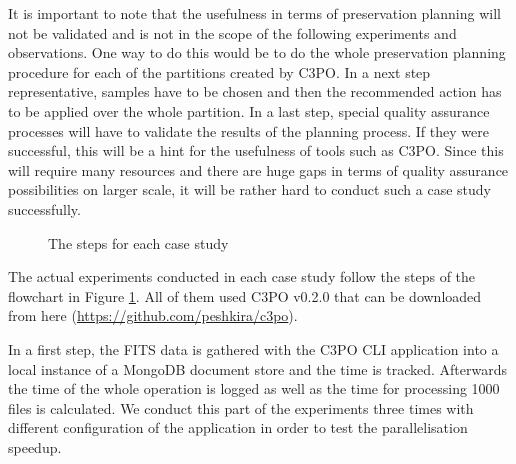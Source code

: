 It is important to note that the usefulness in terms of preservation planning will not be validated and is not in the scope of the following experiments and observations.
One way to do this would be to do the whole preservation planning procedure for each of the partitions created by C3PO. In a next step representative, samples have to be chosen and then the recommended action has to be applied over the whole partition.
In a last step, special quality assurance processes will have to validate the results of the planning process.
If they were successful, this will be a hint for the usefulness of tools such as C3PO.
Since this will require many resources and there are huge gaps in terms of quality assurance possibilities on larger scale, it will be rather hard to conduct such a case study successfully.

\begin{figure}[tbp]
\begin{center}
\caption{The steps for each case study}
\label{fig:exp_flowchart}
\end{center}
\end{figure}

The actual experiments conducted in each case study follow the steps of the flowchart in Figure \ref{fig:exp_flowchart}.
All of them used C3PO v0.2.0 that can be downloaded from here (\url{https://github.com/peshkira/c3po}). 

In a first step, the FITS data is gathered with the C3PO CLI application into a local instance of a MongoDB document store and the time is tracked. Afterwards the time of
the whole operation is logged as well as the time for processing 1000 files is calculated. We conduct this part of the
experiments three times with different configuration of the application in order to test the parallelisation speedup.

